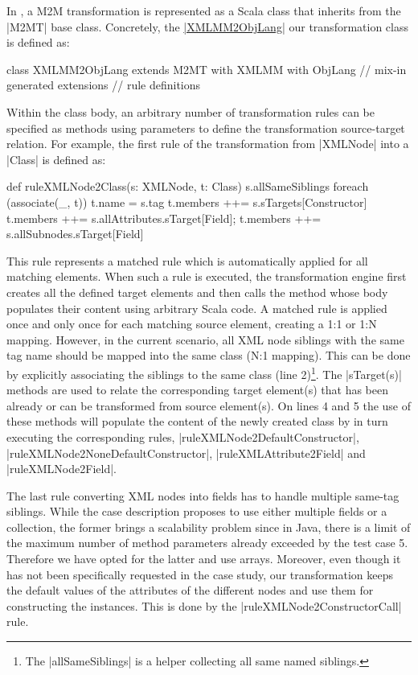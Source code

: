 In \SIGMA, a M2M transformation is represented as a Scala class that inherits from the \Scala|M2MT| base class.
Concretely, the \href{https://github.com/fikovnik/ttc14-fixml-sigma/blob/master/ttc14-fixml-base/src/fr/inria/spirals/sigma/ttc14/fixml/XMLMM2ObjLang.scala}{\Scala|XMLMM2ObjLang|} our transformation class is defined as:
%
\begin{scalacode}
class XMLMM2ObjLang extends M2MT with XMLMM with ObjLang { // mix-in generated extensions
  // rule definitions 
}  
\end{scalacode}
%
Within the class body, an arbitrary number of transformation rules can be specified as methods using parameters to define the transformation source-target relation.
For example, the first rule of the transformation from \Scala|XMLNode| into a \Scala|Class| is defined as:
%
\begin{scalacode}
def ruleXMLNode2Class(s: XMLNode, t: Class) {
  s.allSameSiblings foreach (associate(_, t))
  t.name = s.tag
  t.members ++= s.sTargets[Constructor]
  t.members ++= s.allAttributes.sTarget[Field]; t.members ++= s.allSubnodes.sTarget[Field]
}
\end{scalacode}
%
This rule represents a matched rule which is automatically applied for all matching elements.
When such a rule is executed, the transformation engine first creates all the defined target elements and then calls the method whose body populates their content using arbitrary Scala code.
A matched rule is applied once and only once for each matching source element, creating a 1:1 or 1:N mapping.
However, in the current scenario, all XML node siblings with the same tag name should be mapped into the same class (N:1 mapping).
This can be done by explicitly associating the siblings to the same class (line 2)\footnote{The \Scala|allSameSiblings| is a helper collecting all same named siblings.}.
%
The \Scala|sTarget(s)| methods are used to relate the corresponding target element(s) that has been already or can be transformed from source element(s).
On lines 4 and 5 the use of these methods will populate the content of the newly created class by in turn executing the corresponding rules, \Ie \Scala|ruleXMLNode2DefaultConstructor|, \Scala|ruleXMLNode2NoneDefaultConstructor|, \Scala|ruleXMLAttribute2Field| and \Scala|ruleXMLNode2Field|.

The last rule converting XML nodes into fields has to handle multiple same-tag siblings.
While the case description proposes to use either multiple fields or a collection, the former brings a scalability problem since in Java, there is a limit of the maximum number of method parameters already exceeded by the test case 5.
Therefore we have opted for the latter and use arrays.
Moreover, even though it has not been specifically requested in the case study, our transformation keeps the default values of the attributes of the different nodes and use them for constructing the instances.
This is done by the \Scala|ruleXMLNode2ConstructorCall| rule.

